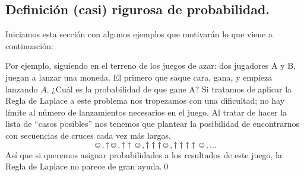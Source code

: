 \subsection{Definición (casi) rigurosa de probabilidad.}
\label{Cap03:def:DefinicionProbabilidad}



Iniciamos esta secci\'on con algunos ejemplos que motivar\'an lo que viene a continuaci\'on:

\begin{Ejemplo}\label{Cap03:ejem:LanzamientoMonedaHastPrimeraCara}
Por ejemplo, siguiendo en el terreno de los juegos de azar: dos jugadores A y B, juegan a lanzar una moneda. El primero que saque cara, gana, y empieza lanzando $A$. ¿Cuál es la probabilidad de que gane A?
Si tratamos de aplicar la Regla de Laplace a este problema nos tropezamos con una dificultad; no hay límite al número de lanzamientos necesarios en el juego. Al tratar de hacer la lista de ``casos posibles'' nos tenemos que plantear la posibilidad de encontrarnos con secuencias de cruces cada vez más largas.
    \[
        \smiley, \dag\smiley, \dag \dag\smiley, \dag \dag \dag\smiley, \dag \dag \dag \dag\smiley,\ldots
    \]
Así que si queremos asignar probabilidades a los resultados de este juego, la Regla de Laplace no parece de gran ayuda.\qed
\end{Ejemplo}


